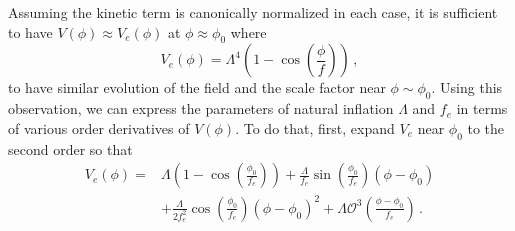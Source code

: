 \documentclass[12pt]{article}
\begin{document}
Assuming the kinetic term is canonically normalized in each case, it is sufficient to have $V\left(\phi\right) \approx V_{e}\left(\phi\right)$ at $\phi \approx \phi_0$ where
\begin{equation} \label{eq:naturalInflationPotential}
  V_e\left(\phi\right) = \Lambda^4 \left(1 - \cos\left(\frac{\phi}{f}\right)\right)\,,
\end{equation}
to have similar evolution of the field and the scale factor near $\phi \sim \phi_0$.
Using this observation, we can express the parameters of natural inflation $\Lambda$ and $f_e$ in terms of various order derivatives of $V\left(\phi\right)$.
To do that, first, expand $V_{e}$ near $\phi_0$ to the second order so that
\begin{equation} \label{eq:naturalInflationSeries}
  \begin{aligned}
    V_{e}\left(\phi\right) =
      &\Lambda \left(1 - \cos\left(\frac{\phi_0}{f_e}\right)\right)
        + \frac{\Lambda}{f_e} \sin\left(\frac{\phi_0}{f_e}\right) \left(\phi - \phi_0\right)\\
      & + \frac{\Lambda}{2 f_e^2} \cos\left(\frac{\phi_0}{f_e}\right) \left(\phi - \phi_0\right)^2
        + \Lambda \mathcal{O}^3\left(\frac{\phi - \phi_0}{f_e}\right)\,.
  \end{aligned}
\end{equation}
\end{document}
